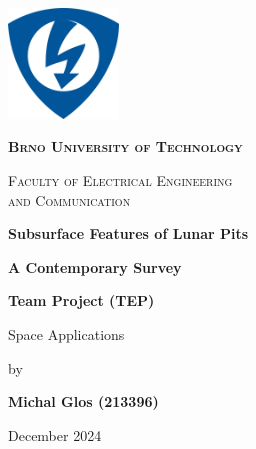 \begin{titlepage}
    \centering
    \vspace{3cm}
    \includegraphics[width=0.22\textwidth]{img/fekt-logo.png} \\
    \vspace{0.5cm}
    
    {\scshape\large\bfseries Brno University of Technology \par}
    {\scshape\normalsize Faculty of Electrical Engineering \\ and Communication \par}
    \vspace{3.33cm}
    
    {\Huge\bfseries Subsurface Features of Lunar Pits} \\ 
    {\Large\bfseries\vspace{0.5cm} A Contemporary Survey \par}
    \vspace{2.66cm}

    {\LARGE\bfseries Team Project (TEP)} \\
    {\Large Space Applications\par}
    \vspace{3.33cm}
    
    {\Large by \par}
    {\Large\bfseries Michal Glos (213396) \par}
    \vfill

    
    {\large December 2024 \par}
\end{titlepage}
